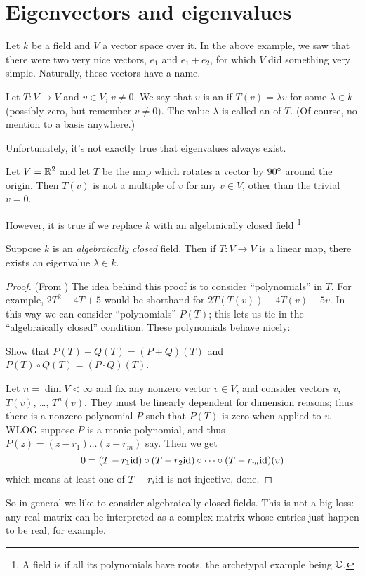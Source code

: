 \section{Eigenvectors and eigenvalues}
Let $k$ be a field and $V$ a vector space over it.
In the above example, we saw that there were two very nice
vectors, $e_1$ and $e_1+e_2$, for which $V$ did something very simple.
Naturally, these vectors have a name.
\begin{definition}
	Let $T : V \to V$ and $v \in V$, $v \neq 0$.
	We say that $v$ is an  if $T(v) = \lambda v$
	for some $\lambda \in k$ (possibly zero, but remember $v \neq 0$).
	The value $\lambda$ is called an  of $T$.
	(Of course, no mention to a basis anywhere.)
\end{definition}

Unfortunately, it's not exactly true that eigenvalues always exist.
\begin{example}
	Let $V = \mathbb R^2$ and let $T$ be the map which rotates a vector by $90^\circ$
	around the origin.
	Then $T(v)$ is not a multiple of $v$ for any $v \in V$, other than the trivial $v=0$.
\end{example}

However, it is true if we replace $k$ with an algebraically closed field
\footnote{A field is  if all its
polynomials have roots, the archetypal example being $\mathbb C$.}
\begin{theorem}
	Suppose $k$ is an \emph{algebraically closed} field.
	Then if $T : V \to V$ is a linear map,
	there exists an eigenvalue $\lambda \in k$.
\end{theorem}
\begin{proof}
	(From \cite{ref:axler})
	The idea behind this proof is to consider ``polynomials'' in $T$.
	For example, $2T^2-4T+5$ would be shorthand for $2T(T(v)) - 4T(v) + 5v$.
	In this way we can consider ``polynomials'' $P(T)$;
	this lets us tie in the ``algebraically closed'' condition.
	These polynomials behave nicely:
	\begin{ques}
		Show that $P(T)+Q(T) = (P+Q)(T)$ and $P(T) \circ Q(T) = (P \cdot Q)(T)$.
	\end{ques}

	Let $n = \dim V < \infty$ and fix any nonzero vector $v \in V$,
	and consider vectors $v$, $T(v)$, \dots, $T^n (v)$.
	They must be linearly dependent for dimension reasons;
	thus there is a nonzero polynomial $P$ such that $P(T)$
	is zero when applied to $v$.
	WLOG suppose $P$ is a monic polynomial,
	and thus $P(z) = (z-r_1)\dots(z-r_m)$ say.
	Then we get
	\[ 0 = (T - r_1 \mathrm{id}) \circ (T - r_2 \mathrm{id}) \circ \dots
		\circ (T - r_m \mathrm{id})(v) \]
	which means at least one of $T - r_i \mathrm{id}$ is not injective, done.
\end{proof}
So in general we like to consider algebraically closed fields.
This is not a big loss: any real matrix can be interpreted as a complex matrix
whose entries just happen to be real, for example.

